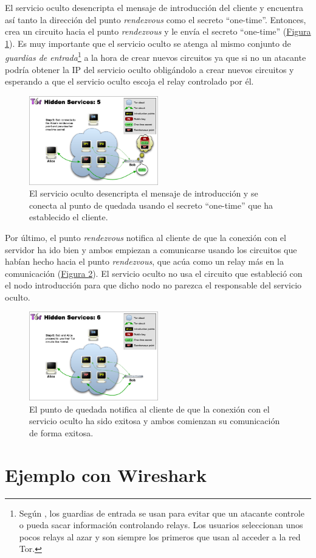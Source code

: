 \documentclass[10pt,a4paper,spanish]{article}
\begin{document}
El servicio oculto desencripta el mensaje de introducción del cliente y encuentra así tanto la dirección del punto \textit{rendezvous} como el secreto ``one-time''. Entonces, crea un circuito hacia el punto \textit{rendezvous} y le envía el secreto ``one-time'' (\hyperref[ths5]{Figura \ref*{ths5}}). Es muy importante que el servicio oculto se atenga al mismo conjunto de \textit{guardias de entrada}\footnote{Según \cite{entryguards}, los guardias de entrada se usan para evitar que un atacante controle o pueda sacar información controlando relays. Los usuarios seleccionan unos pocos relays al azar y son siempre los primeros que usan al acceder a la red Tor.} a la hora de crear nuevos circuitos ya que si no un atacante podría obtener la IP del servicio oculto obligándolo a crear nuevos circuitos y esperando a que el servicio oculto escoja el relay controlado por él.

\begin{figure}[!h]
    \centering
    \includegraphics[width=0.5\textwidth]{THS-5}
    \caption{El servicio oculto desencripta el mensaje de introducción y se conecta al punto de quedada usando el secreto ``one-time'' que ha establecido el cliente.}
    \label{ths5}
\end{figure}

Por último, el punto \textit{rendezvous} notifica al cliente de que la conexión con el servidor ha ido bien y ambos empiezan a comunicarse usando los circuitos que habían hecho hacia el punto \textit{rendezvous}, que acúa como un relay más en la comunicación (\hyperref[ths6]{Figura \ref*{ths6}}). El servicio oculto no usa el circuito que estableció con el nodo introducción para que dicho nodo no parezca el responsable del servicio oculto. 

\begin{figure}[!h]
    \centering
    \includegraphics[width=0.5\textwidth]{THS-6}
    \caption{El punto de quedada notifica al cliente de que la conexión con el servicio oculto ha sido exitosa y ambos comienzan su comunicación de forma exitosa.}
    \label{ths6}
\end{figure}

\section{Ejemplo con Wireshark}

\end{document}

